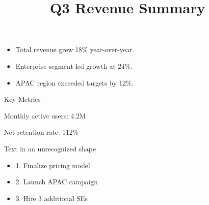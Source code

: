 \documentclass[11pt,a4paper]{article}
\title{Q3 Revenue Summary}
\begin{document}
\maketitle

\begin{itemize}
\item Total revenue grew 18\% year-over-year.
\item Enterprise segment led growth at 24\%.
\item APAC region exceeded targets by 12\%.
\end{itemize}

Key Metrics

Monthly active users: 4.2M

Net retention rate: 112\%

Text in an unrecognized shape

\begin{itemize}
\item 1. Finalize pricing model
\item 2. Launch APAC campaign
\item 3. Hire 3 additional SEs
\end{itemize}
\end{document}

